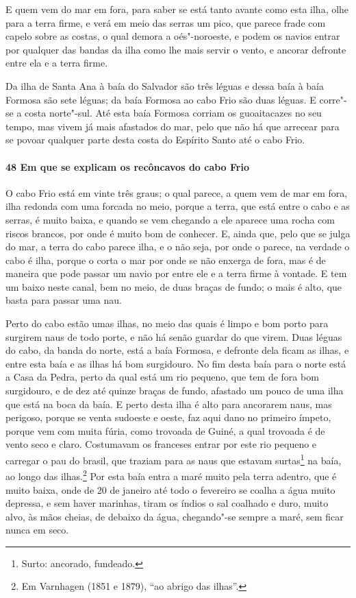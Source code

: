 \begin{linenumbers}
E quem vem do mar em fora, para saber se está tanto avante como esta ilha, olhe para a
terra firme, e verá em meio das serras um pico, que parece frade com capelo sobre as
costas, o qual demora a oés"-noroeste, e podem os navios entrar por qualquer das bandas da
ilha como lhe mais servir o vento, e ancorar defronte entre ela e a terra firme.

Da ilha de Santa Ana à baía do Salvador são três léguas e dessa baía à baía Formosa são
sete léguas; da baía Formosa ao cabo Frio são duas léguas. E corre"-se a costa norte"-sul.
Até esta baía Formosa corriam os guoaitacazes no seu tempo, mas vivem já mais afastados do
mar, pelo que não há que arrecear para se povoar qualquer parte desta costa do Espírito
Santo até o cabo Frio.

\paragraph{48 Em que se explicam os recôncavos do cabo Frio} \quad
O cabo Frio está em vinte três graus; o qual parece, a quem vem de mar em fora, ilha
redonda com uma forcada no meio, porque a terra, que está entre o cabo e as serras, é
muito baixa, e quando se vem chegando a ele aparece uma rocha com riscos brancos, por onde
é muito bom de conhecer. E, ainda que, pelo que se julga do mar, a terra do cabo parece
ilha, e o não seja, por onde o parece, na verdade o cabo é ilha, porque o corta o mar por
onde se não enxerga de fora, mas é de maneira que pode passar um navio por entre ele e a
terra firme à vontade. E tem um baixo neste canal, bem no meio, de duas braças de fundo; o
mais é alto, que basta para passar uma nau.

Perto do cabo estão umas ilhas, no meio das quais é limpo e bom porto para surgirem naus
de todo porte, e não há senão guardar do que virem. Duas léguas do cabo, da banda do
norte, está a baía Formosa, e defronte dela ficam as ilhas, e entre esta baía e as ilhas
há bom surgidouro. No fim desta baía para o norte está a Casa da Pedra, perto da qual está
um rio pequeno, que tem de fora bom surgidouro, e de dez até quinze braças de fundo,
afastado um pouco de uma ilha que está na boca da baía. E perto desta ilha é alto para
ancorarem naus, mas perigoso, porque se venta sudoeste e oeste, faz aqui dano no primeiro
ímpeto, porque vem com muita fúria, como trovoada de Guiné, a qual trovoada é de vento
seco e claro. Costumavam os franceses entrar por este rio pequeno e carregar o pau do
brasil, que traziam para as naus que estavam surtas\footnote{ Surto: ancorado, fundeado.}
na baía, ao longo das ilhas.\footnote{ Em Varnhagen (1851 e 1879), ``ao abrigo das
ilhas''.} Por esta baía entra a maré muito pela terra adentro, que é muito baixa, onde de
20 de janeiro até todo o fevereiro se coalha a água muito depressa, e sem haver marinhas,
tiram os índios o sal coalhado e duro, muito alvo, às mãos cheias, de debaixo da água,
chegando"-se sempre a maré, sem ficar nunca em seco.


\end{linenumbers}
